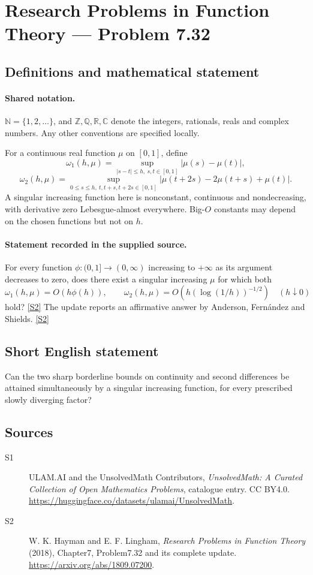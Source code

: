\documentclass[11pt]{article}
\newcommand{\sref}[2]{\hyperlink{source:#1:#2}{[S#2]}}
\begin{document}
\section{Research Problems in Function Theory — Problem 7.32}\label{statement}

\subsection{Definitions and mathematical statement}

\paragraph{Shared notation.}$\mathbb N=\{1,2,\ldots\}$, and $\mathbb Z,\mathbb Q,\mathbb R,\mathbb C$ denote the integers, rationals, reals and complex numbers. Any other conventions are specified locally.


For a continuous real function $\mu$ on $[0,1]$, define
\[\omega_1(h,\mu)=\sup_{|s-t|\le h,\ s,t\in[0,1]}|\mu(s)-\mu(t)|,\]
\[\omega_2(h,\mu)=\sup_{0\le s\le h,\ t,t+s,t+2s\in[0,1]}|\mu(t+2s)-2\mu(t+s)+\mu(t)|.\]
A singular increasing function here is nonconstant, continuous and nondecreasing, with derivative zero Lebesgue-almost everywhere. Big-$O$ constants may depend on the chosen functions but not on $h$.

\paragraph{Statement recorded in the supplied source.}
For every function $\phi:(0,1]\to(0,\infty)$ increasing to $+\infty$ as its argument decreases to zero, does there exist a singular increasing $\mu$ for which both
\[\omega_1(h,\mu)=O(h\phi(h)),\qquad
\omega_2(h,\mu)=O\!\left(h(\log(1/h))^{-1/2}\right)\quad(h\downarrow0)
\]
hold? \sref{statement}{2}
The update reports an affirmative answer by Anderson, Fernández and Shields. \sref{statement}{2}
\subsection{Short English statement}
Can the two sharp borderline bounds on continuity and second differences be attained simultaneously by a singular increasing function, for every prescribed slowly diverging factor?
\subsection{Sources}
\begin{description}
\item[\hypertarget{source:statement:1}{S1}] ULAM.AI and the UnsolvedMath Contributors, \emph{UnsolvedMath: A Curated Collection of Open Mathematics Problems}, catalogue entry. CC BY4.0. \url{https://huggingface.co/datasets/ulamai/UnsolvedMath}.
\item[\hypertarget{source:statement:2}{S2}] W. K. Hayman and E. F. Lingham, \emph{Research Problems in Function Theory} (2018), Chapter7, Problem7.32 and its complete update. \url{https://arxiv.org/abs/1809.07200}.
\end{description}
\label{end:statement}
\end{document}
